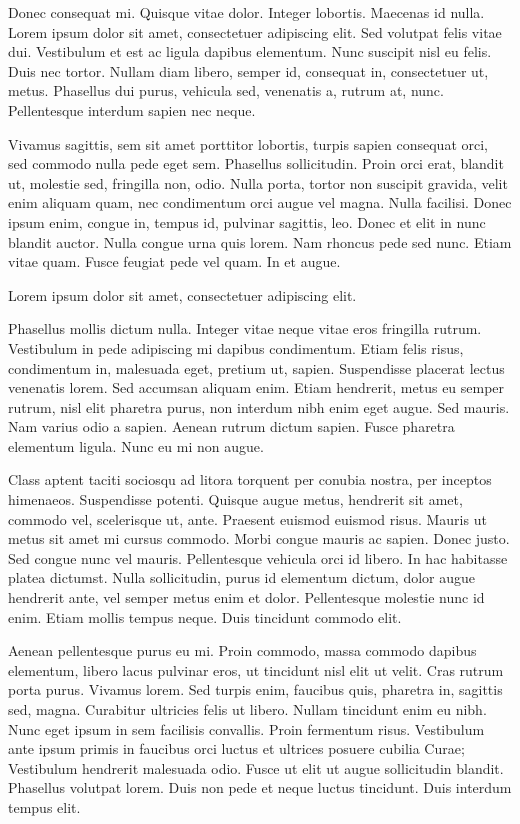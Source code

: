 \documentclass[../hdr.tex]{subfiles}
\begin{document}
\bigskip 

Donec consequat mi. Quisque vitae dolor. Integer lobortis. Maecenas id nulla.
Lorem ipsum dolor sit amet, consectetuer adipiscing elit. Sed volutpat felis
vitae dui. Vestibulum et est ac ligula dapibus elementum. Nunc suscipit nisl eu
felis. Duis nec tortor. Nullam diam libero, semper id, consequat in,
consectetuer ut, metus. Phasellus dui purus, vehicula sed, venenatis a, rutrum
at, nunc. Pellentesque interdum sapien nec neque.

Vivamus sagittis, sem sit amet porttitor lobortis, turpis sapien consequat orci,
sed commodo nulla pede eget sem. Phasellus sollicitudin. Proin orci erat,
blandit ut, molestie sed, fringilla non, odio. Nulla porta, tortor non suscipit
gravida, velit enim aliquam quam, nec condimentum orci augue vel magna. Nulla
facilisi. Donec ipsum enim, congue in, tempus id, pulvinar sagittis, leo. Donec
et elit in nunc blandit auctor. Nulla congue urna quis lorem. Nam rhoncus pede
sed nunc. Etiam vitae quam. Fusce feugiat pede vel quam. In et augue.

Lorem ipsum dolor sit amet, consectetuer adipiscing elit.

\bigskip 

Phasellus mollis dictum nulla. Integer vitae neque vitae eros fringilla rutrum.
Vestibulum in pede adipiscing mi dapibus condimentum. Etiam felis risus,
condimentum in, malesuada eget, pretium ut, sapien. Suspendisse placerat lectus
venenatis lorem. Sed accumsan aliquam enim. Etiam hendrerit, metus eu semper
rutrum, nisl elit pharetra purus, non interdum nibh enim eget augue. Sed mauris.
Nam varius odio a sapien. Aenean rutrum dictum sapien. Fusce pharetra elementum
ligula. Nunc eu mi non augue.

Class aptent taciti sociosqu ad litora torquent per conubia nostra, per inceptos
himenaeos. Suspendisse potenti. Quisque augue metus, hendrerit sit amet, commodo
vel, scelerisque ut, ante. Praesent euismod euismod risus. Mauris ut metus sit
amet mi cursus commodo. Morbi congue mauris ac sapien. Donec justo. Sed congue
nunc vel mauris. Pellentesque vehicula orci id libero. In hac habitasse platea
dictumst. Nulla sollicitudin, purus id elementum dictum, dolor augue hendrerit
ante, vel semper metus enim et dolor. Pellentesque molestie nunc id enim. Etiam
mollis tempus neque. Duis tincidunt commodo elit.

Aenean pellentesque purus eu mi. Proin commodo, massa commodo dapibus elementum,
libero lacus pulvinar eros, ut tincidunt nisl elit ut velit. Cras rutrum porta
purus. Vivamus lorem. Sed turpis enim, faucibus quis, pharetra in, sagittis sed,
magna. Curabitur ultricies felis ut libero. Nullam tincidunt enim eu nibh. Nunc
eget ipsum in sem facilisis convallis. Proin fermentum risus. Vestibulum ante
ipsum primis in faucibus orci luctus et ultrices posuere cubilia Curae;
Vestibulum hendrerit malesuada odio. Fusce ut elit ut augue sollicitudin
blandit. Phasellus volutpat lorem. Duis non pede et neque luctus tincidunt. Duis
interdum tempus elit.
\end{document}
